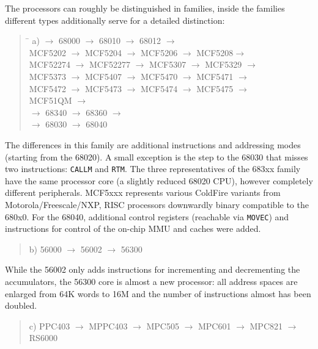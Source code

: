 \documentclass[12pt,twoside]{report}
\newcommand{\tty}[1]{{\tt #1}}
\begin{document}
The processors can roughly be distinguished in families, inside the
families different types additionally serve for a detailed
distinction:
\begin{quote}
\begin{tabbing}
\hspace{0.7cm} \= \kill
a)  $\rightarrow$ 68000 $\rightarrow$ 68010 $\rightarrow$ 68012 $\rightarrow$ \\
   \> MCF5202 $\rightarrow$ MCF5204 $\rightarrow$ MCF5206 $\rightarrow$ MCF5208$\rightarrow$ \\
   \> MCF52274 $\rightarrow$ MCF52277 $\rightarrow$ MCF5307 $\rightarrow$ MCF5329 $\rightarrow$ \\
   \> MCF5373 $\rightarrow$ MCF5407 $\rightarrow$ MCF5470 $\rightarrow$ MCF5471 $\rightarrow$ \\
   \> MCF5472 $\rightarrow$ MCF5473 $\rightarrow$ MCF5474 $\rightarrow$ MCF5475 $\rightarrow$ \\
   \> MCF51QM $\rightarrow$ \\
    $\rightarrow$ 68340 $\rightarrow$ 68360 $\rightarrow$ \\
    $\rightarrow$ 68030 $\rightarrow$ 68040
\end{tabbing}
\end{quote}
The differences in this family are additional instructions and
addressing modes (starting from the 68020).  A small exception is the step
to the 68030 that misses two instructions: \tty{CALLM} and \tty{RTM}.  The
three representatives of the 683xx family have the same processor core (a
slightly reduced 68020 CPU), however completely different peripherals.
MCF5xxx represents various ColdFire variants from Motorola/Freescale/NXP,
RISC processors downwardly binary compatible to the 680x0.  For the 68040,
additional control registers (reachable via \tty{MOVEC}) and instructions
for control of the on-chip MMU and caches were added.
\begin{quote}
b) 56000 $\longrightarrow$ 56002 $\longrightarrow$ 56300
\end{quote}
While the 56002 only adds instructions for incrementing and decrementing
the accumulators, the 56300 core is almost a new processor: all address
spaces are enlarged from 64K words to 16M and the number of instructions
almost has been doubled.
\begin{quote}
c) PPC403 $\rightarrow$ MPPC403 $\rightarrow$ MPC505 $\rightarrow$ MPC601 $\rightarrow$ MPC821 $\rightarrow$ RS6000
\end{quote}
\end{document}
